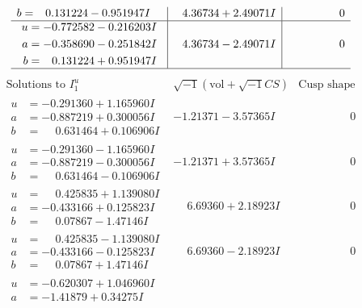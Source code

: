 \documentclass[1p]{elsarticle_modified}
\theoremstyle{definition}
\newcommand{\I}{\sqrt{-1}}
\begin{document}
$$\begin{array}{c|c|c}
\begin{aligned}
b &= \phantom{-}0.131224 - 0.951947 I\end{aligned}
 & \phantom{-}4.36734 + 2.49071 I & \phantom{-0.000000 } 0 \\ \hline\begin{aligned}
u &= -0.772582 - 0.216203 I \\
a &= -0.358690 - 0.251842 I \\
b &= \phantom{-}0.131224 + 0.951947 I\end{aligned}
 & \phantom{-}4.36734 - 2.49071 I & \phantom{-0.000000 } 0\\
 \hline 
 \end{array}$$\newpage$$\begin{array}{c|c|c}  
\text{Solutions to }I^u_{1}& \I (\text{vol} + \sqrt{-1}CS) & \text{Cusp shape}\\
 \hline 
\begin{aligned}
u &= -0.291360 + 1.165960 I \\
a &= -0.887219 + 0.300056 I \\
b &= \phantom{-}0.631464 + 0.106906 I\end{aligned}
 & -1.21371 - 3.57365 I & \phantom{-0.000000 } 0 \\ \hline\begin{aligned}
u &= -0.291360 - 1.165960 I \\
a &= -0.887219 - 0.300056 I \\
b &= \phantom{-}0.631464 - 0.106906 I\end{aligned}
 & -1.21371 + 3.57365 I & \phantom{-0.000000 } 0 \\ \hline\begin{aligned}
u &= \phantom{-}0.425835 + 1.139080 I \\
a &= -0.433166 + 0.125823 I \\
b &= \phantom{-}0.07867 - 1.47146 I\end{aligned}
 & \phantom{-}6.69360 + 2.18923 I & \phantom{-0.000000 } 0 \\ \hline\begin{aligned}
u &= \phantom{-}0.425835 - 1.139080 I \\
a &= -0.433166 - 0.125823 I \\
b &= \phantom{-}0.07867 + 1.47146 I\end{aligned}
 & \phantom{-}6.69360 - 2.18923 I & \phantom{-0.000000 } 0 \\ \hline\begin{aligned}
u &= -0.620307 + 1.046960 I \\
a &= -1.41879 + 0.34275 I \\

\end{aligned}
\end{array}$$
\end{document}

